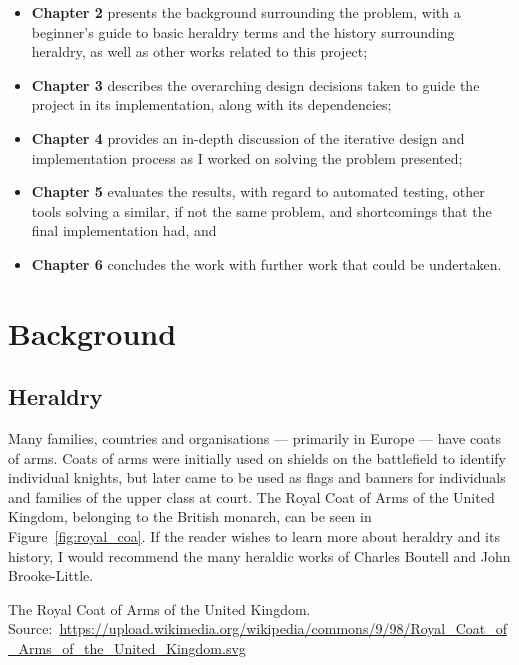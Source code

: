 \documentclass[nobib, a4paper, twoside, justified]{tufte-book}
\begin{document}
\begin{itemize}
  \item \textbf{Chapter 2} presents the background surrounding the problem, with a beginner's
    guide to basic heraldry terms and the history surrounding heraldry, as well as other works
    related to this project;
  \item \textbf{Chapter 3} describes the overarching design decisions taken to guide the project in
    its implementation, along with its dependencies;
  \item \textbf{Chapter 4} provides an in-depth discussion of the iterative design and implementation
    process as I worked on solving the problem presented;
  \item \textbf{Chapter 5} evaluates the results, with regard to automated testing, other tools
    solving a similar, if not the same problem, and shortcomings that the final implementation
    had, and
  \item \textbf{Chapter 6} concludes the work with further work that could be undertaken.
\end{itemize}

\chapter{Background}\label{cha:background}

\section{Heraldry}\label{sec:heraldry}

Many families, countries and organisations --- primarily in Europe --- have coats of arms. Coats of
arms were initially used on shields on the battlefield to identify individual knights, but later
came to be used as flags and banners for individuals and families of the upper class at court. The
Royal Coat of Arms of the United Kingdom, belonging to the British monarch, can be seen in
Figure~\ref{fig:royal_coa}. If the reader wishes to learn more about heraldry and its history, I
would recommend the many heraldic works of Charles Boutell and John Brooke-Little.

\begin{marginfigure}
  \centering
  \def\svgwidth{0.8\linewidth}
  
  \caption{The Royal Coat of Arms of the United Kingdom.
  Source:~\url{https://upload.wikimedia.org/wikipedia/commons/9/98/Royal_Coat_of_Arms_of_the_United_Kingdom.svg}}%
  \label{fig:royal_coa}
\end{marginfigure}
\end{document}
